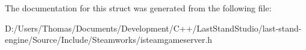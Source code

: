 The documentation for this struct was generated from the following file\+:\begin{DoxyCompactItemize}
\item 
D\+:/\+Users/\+Thomas/\+Documents/\+Development/\+C++/\+Last\+Stand\+Studio/last-\/stand-\/engine/\+Source/\+Include/\+Steamworks/isteamgameserver.\+h\end{DoxyCompactItemize}
